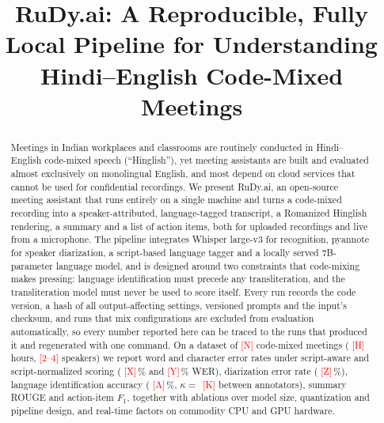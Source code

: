 \documentclass[conference]{IEEEtran}
\newif\iffinal
\newcommand{\pending}[1]{%
  \iffinal\errmessage{Unfinished placeholder: #1}\else\textcolor{red}{[#1]}\fi}
\newcommand{\system}{RuDy.ai}
\begin{document}
\title{\system: A Reproducible, Fully Local Pipeline for Understanding
Hindi--English Code-Mixed Meetings}

\author{%
\IEEEauthorblockN{\pending{Author 1}, \pending{Author 2}, \pending{Author 3}}
\IEEEauthorblockA{\pending{Department}, \pending{Institution}\\
\pending{City, Country}\\
\pending{email addresses}}
}

\maketitle

\begin{abstract}
Meetings in Indian workplaces and classrooms are routinely conducted in
Hindi--English code-mixed speech (``Hinglish''), yet meeting assistants are
built and evaluated almost exclusively on monolingual English, and most depend
on cloud services that cannot be used for confidential recordings. We present
\system{}, an open-source meeting assistant that runs entirely on a single
machine and turns a code-mixed recording into a speaker-attributed,
language-tagged transcript, a Romanized Hinglish rendering, a summary and a list
of action items, both for uploaded recordings and live from a microphone. The
pipeline integrates Whisper large-v3 for recognition, pyannote for speaker
diarization, a script-based language tagger and a locally served
7B-parameter language model, and is designed around two constraints that
code-mixing makes pressing: language identification must precede any
transliteration, and the transliteration model must never be used to score
itself. Every run records the code version, a hash of all output-affecting
settings, versioned prompts and the input's checksum, and runs that mix
configurations are excluded from evaluation automatically, so every number
reported here can be traced to the runs that produced it and regenerated with
one command. On a dataset of \pending{N} code-mixed meetings (\pending{H} hours,
\pending{2--4} speakers) we report word and character error rates under
script-aware and script-normalized scoring (\pending{X}\,\% and
\pending{Y}\,\% WER), diarization error rate (\pending{Z}\,\%), language
identification accuracy (\pending{A}\,\%, $\kappa=$\,\pending{K} between
annotators), summary ROUGE and action-item $F_1$, together with ablations over
model size, quantization and pipeline design, and real-time factors on
commodity CPU and GPU hardware.
\end{abstract}
\end{document}
